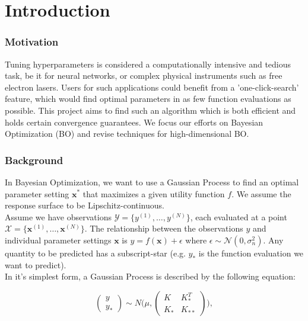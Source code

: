 \chapter{Introduction}
\subsection{Motivation}

Tuning hyperparameters is considered a computationally intensive and tedious task, be it for neural networks, or complex physical instruments such as free electron lasers.
Users for such applications could benefit from a 'one-click-search' feature, which would find optimal parameters in as few function evaluations as possible.
This project aims to find such an algorithm which is both efficient and holds certain convergence guarantees.
We focus our efforts on Bayesian Optimization (BO) and revise techniques for high-dimensional BO. \\

\subsection{Background}

In Bayesian Optimization, we want to use a Gaussian Process to find an optimal parameter setting $\mathbf{x^*}$ that maximizes a given utility function $f$.
We assume the response surface to be Lipschitz-continuous. \\

Assume we have observations $ \mathcal{Y} = \{ y^{(1)}, \ldots, y^{(N)} \}$, each evaluated at a point $ \mathcal{X} = \{  \mathbf{x}^{(1)}, \ldots, \mathbf{x}^{(N)} \}$.
The relationship between the observations $y$ and individual parameter settings $\mathbf{x}$ is $y = f \left( \mathbf{x} \right) + \epsilon$ where $\epsilon \sim  \mathcal{N} \left( 0, \sigma^2_n \right)$. Any quantity to be predicted has a subscript-star (e.g. $y_*$ is the function evaluation we want to predict).\\

In it's simplest form, a Gaussian Process is described by the following equation:

\begin{equation}
\begin{pmatrix} y \\
y_* \end{pmatrix} \sim N\Biggl(\mu,\begin{pmatrix} K & K^T_*\\
 K_* & K_{**} \end{pmatrix}\Biggr),
\end{equation}


